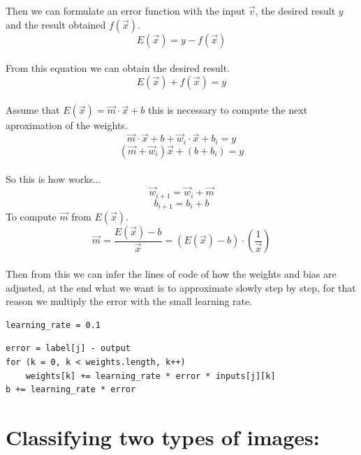 \documentclass[12pt]{article}
\begin{document}
Then we can formulate an error function with the input $\vec{v}$, the desired result $y$ and the
result obtained $f(\vec{x})$.\\
\[
  E(\vec{x}) = y - f(\vec{x})
\]\\
From this equation we can obtain the desired result.\\
\[
  E(\vec{x}) + f(\vec{x}) = y
\]\\
Assume that $E(\vec{x}) = \vec{m} \cdot \vec{x} + b$ this is necessary to compute the
next aproximation of the weights.\\
\[
  \vec{m} \cdot \vec{x} + b + \vec{w}_{i} \cdot \vec{x} + b_{i} = y
\]
\[
  (\vec{m} +  \vec{w}_{i})\vec{x} + (b + b_{i}) = y
\]\\
So this is how works...
\[
  \vec{w}_{i + 1} = \vec{w}_i + \vec{m}
\]
\[
  b_{i + 1} = b_i + b
\]
To compute $\vec{m}$ from $E(\vec{x})$.\\
\[
  \vec{m} = \frac{E(\vec{x}) - b}{\vec{x}} = (E(\vec{x}) - b) \cdot (\frac{1}{\vec{x}})
\]\\
Then from this we can infer the lines of code of how the weights and bias are adjusted, at the
end what we want is to approximate slowly step by step, for that reason we multiply the error
with the small learning rate.
\begin{verbatim}
learning_rate = 0.1
\end{verbatim}
\begin{verbatim}
error = label[j] - output
for (k = 0, k < weights.length, k++)
    weights[k] += learning_rate * error * inputs[j][k]
b += learning_rate * error
\end{verbatim}
\section{Classifying two types of images:}
\end{document}
